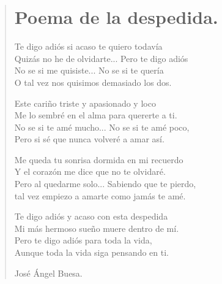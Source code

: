 \documentclass[11pt, portrait, twoside, notitlepage, openright]{book}
\begin{document}
\newpage
\begin{verse}
\begin{center}
\section{Poema de la despedida.}
\end{center}
Te digo adiós si acaso te quiero todavía\\
Quizás no he de olvidarte... Pero te digo adiós\\
No se si me quisiste... No se si te quería\\
O tal vez nos quisimos demasiado los dos.
\newline

Este cariño triste y apasionado y loco\\
Me lo sembré en el alma para quererte a ti.\\
No se si te amé mucho... No se si te amé poco,\\
Pero si sé que nunca volveré a amar así.
\newline

Me queda tu sonrisa dormida en mi recuerdo\\
Y el corazón me dice que no te olvidaré.\\
Pero al quedarme solo... Sabiendo que te pierdo,\\
tal vez empiezo a amarte como jamás te amé.
\newline

Te digo adiós y acaso con esta despedida\\
Mi más hermoso sueño muere dentro de mí.\\
Pero te digo adiós para toda la vida,\\
Aunque toda la vida siga pensando en ti.
\newline

José Ángel Buesa.
\end{verse}
\end{document}
